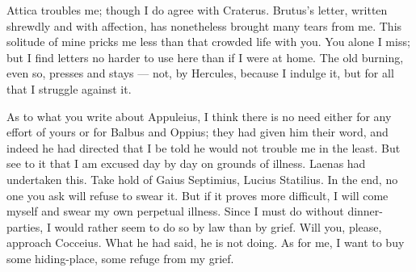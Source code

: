 

 Attica troubles me; though I do agree with Craterus. Brutus's letter, written shrewdly and with affection, has nonetheless brought many tears from me. This solitude of mine pricks me less than that crowded life with you. You alone I miss; but I find letters no harder to use here than if I were at home. The old burning, even so, presses and stays --- not, by Hercules, because I indulge it, but for all that I struggle against it.

 As to what you write about Appuleius, I think there is no need either for any effort of yours or for Balbus and Oppius; they had given him their word, and indeed he had directed that I be told he would not trouble me in the least. But see to it that I am excused day by day on grounds of illness. Laenas had undertaken this. Take hold of Gaius Septimius, Lucius Statilius. In the end, no one you ask will refuse to swear it. But if it proves more difficult, I will come myself and swear my own perpetual illness. Since I must do without dinner-parties, I would rather seem to do so by law than by grief. Will you, please, approach Cocceius. What he had said, he is not doing. As for me, I want to buy some hiding-place, some refuge from my grief.
